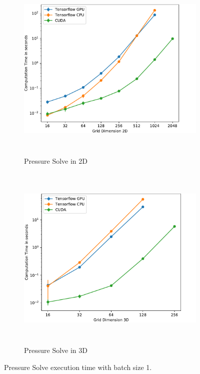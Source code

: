 \begin{figure}[t]
\centering
	\begin{subfigure}[b]{1\textwidth}
		\centering
		\includegraphics[height=9cm, width=14cm]{figures/2d_bs1}

		\caption{Pressure Solve in 2D}
	\end{subfigure}
	\begin{subfigure}[b]{1\textwidth}
		\centering
		\includegraphics[height=9cm, width=14cm]{figures/3d_bs1}

		\caption{Pressure Solve in 3D}
	\end{subfigure}

\caption{Pressure Solve execution time with batch size 1.}	\label{fig:perfbs1}
\end{figure}


